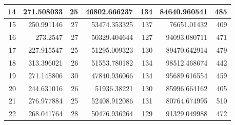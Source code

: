 \begin{table}
\begin{adjustwidth}{}{}
{{\begin{tabular}{|r|r|r|r|r|r|r|}
	\hline
	14                                         & 271.508033                   & 25                                    & 46802.666237                   & 134                                   & 84640.960541                         & 485                                    \\ 
	\hline
	15                                         & 250.991146                   & 27                                    & 53474.353325                   & 137                                   & 76651.01432                          & 409                                    \\ 
	\hline
	16                                         & 273.2547                     & 27                                    & 50329.404644                   & 127                                   & 94093.080711                         & 471                                    \\ 
	\hline
	17                                         & 227.915547                   & 25                                    & 51295.009323                   & 130                                   & 89470.642914                         & 479                                    \\ 
	\hline
	18                                         & 313.396021                   & 26                                    & 51553.780182                   & 134                                   & 98512.468674                         & 442                                    \\ 
	\hline
	19                                         & 271.145806                   & 30                                    & 47840.936066                   & 134                                   & 95689.616554                         & 459                                    \\ 
	\hline
	20                                         & 244.631016                   & 26                                    & 51936.38221                    & 130                                   & 85996.664162                         & 405                                    \\ 
	\hline
	21                                         & 276.977884                   & 25                                    & 52408.912086                   & 131                                   & 80764.674995                         & 510                                    \\ 
	\hline
	22                                         & 268.041764                   & 28                                    & 50476.936264                   & 129                                   & 91329.049988                         & 472                                    \\ 

\end{tabular}}}
\end{adjustwidth}
\end{table}
